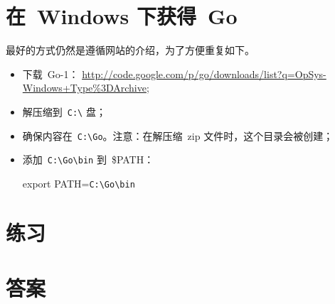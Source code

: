 \section{在~Windows 下获得~Go}

最好的方式仍然是遵循网站\cite{go_install}的介绍，为了方便重复如下。

\begin{itemize}
\item 下载~Go-1：
\url{http://code.google.com/p/go/downloads/list?q=OpSys-Windows+Type%3DArchive};
\item 解压缩到~\verb|C:\| 盘；
\item 确保内容在~\verb|C:\Go|。注意：在解压缩~zip 文件时，这个目录会被创建；
\item 添加~\verb|C:\Go\bin| 到~\$PATH：
\begin{display}
export PATH=\verb|C:\Go\bin|
\end{display}
\end{itemize}

\section{练习}


\cleardoublepage
\section{答案}
\shipoutAnswer
